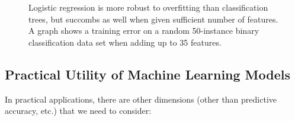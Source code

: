 \begin{refsection}
\begin{figure}[htbp]
\caption{Logistic regression is more robust to overfitting than classification trees, but succombs as well when given sufficient number of features. A graph shows a training error on a random 50-instance binary classification data set when adding up to 35 features.}
\label{fig:lr-overfitting}
\end{figure}

\subsection*{Practical Utility of Machine Learning Models}

In practical applications, there are other dimensions (other than predictive accuracy, etc.) that we need to consider:


\end{refsection}
